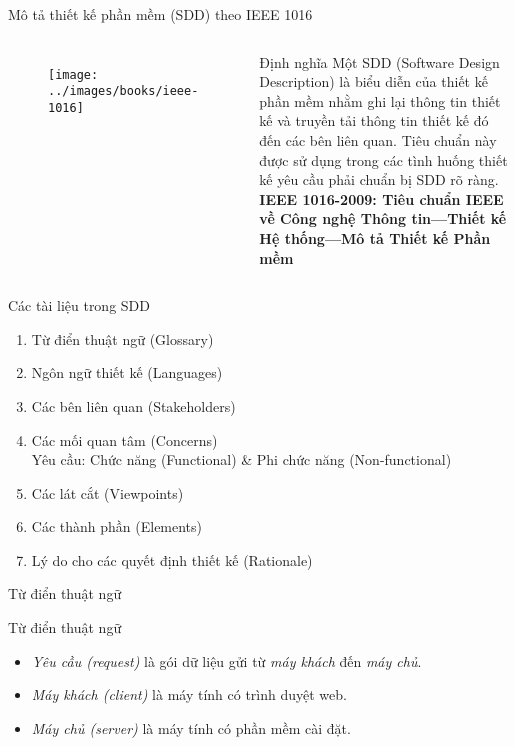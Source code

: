 \documentclass{beamer}
\newcommand{\ul}[1]{\emph{#1}}
\begin{document}
\begin{frame}{Mô tả thiết kế phần mềm (SDD) theo IEEE 1016}
    \begin{columns}
        \begin{figure}
            \centering
            \texttt{[image: ../images/books/ieee-1016]}
        \end{figure}
        \begin{block}{Định nghĩa}
            Một SDD (Software Design Description) là biểu diễn của
            thiết kế phần mềm nhằm ghi lại thông tin thiết kế
            và truyền tải thông tin thiết kế đó đến
            các bên liên quan.
            Tiêu chuẩn này được sử dụng trong
            các tình huống thiết kế yêu cầu phải chuẩn
            bị SDD rõ ràng.\\
            \textbf{IEEE 1016-2009: Tiêu chuẩn IEEE về Công nghệ Thông tin---Thiết kế Hệ thống---Mô tả Thiết kế Phần mềm}
        \end{block}
        \end{columns}
\end{frame}

\begin{frame}{Các tài liệu trong SDD}
    \begin{enumerate}
        \item Từ điển thuật ngữ (Glossary)
        \item Ngôn ngữ thiết kế (Languages)
        \item Các bên liên quan (Stakeholders)
        \item Các mối quan tâm (Concerns)
        \\Yêu cầu: Chức năng (Functional) \& Phi chức năng (Non-functional)
        \item Các lát cắt (Viewpoints)
        \item Các thành phần (Elements)
        \item Lý do cho các quyết định thiết kế (Rationale)
    \end{enumerate}
\end{frame}

\begin{frame}{Từ điển thuật ngữ}
    \begin{block}{Từ điển thuật ngữ}
        \begin{itemize}
            \item \ul{Yêu cầu (request)} là gói dữ liệu gửi từ \ul{máy khách} đến \ul{máy chủ}.
            \item \ul{Máy khách (client)} là máy tính có trình duyệt web.
            \item \ul{Máy chủ (server)} là máy tính có phần mềm cài đặt.
        \end{itemize}
    \end{block}
\end{frame}
\end{document}
